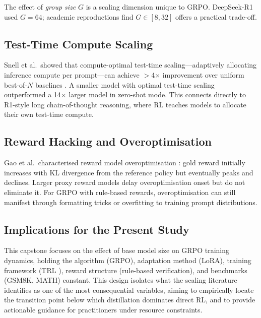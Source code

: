 \documentclass[12pt,a4paper]{report}
\theoremstyle{definition}
\begin{document}
The effect of \emph{group size} $G$ is a scaling dimension unique to GRPO. DeepSeek-R1 used $G = 64$; academic reproductions find $G \in [8, 32]$ offers a practical trade-off.

\subsection{Test-Time Compute Scaling}

Snell et al.\ showed that compute-optimal test-time scaling---adaptively allocating inference compute per prompt---can achieve $>$4$\times$ improvement over uniform best-of-$N$ baselines \cite{snell2024scaling}. A smaller model with optimal test-time scaling outperformed a 14$\times$ larger model in zero-shot mode. This connects directly to R1-style long chain-of-thought reasoning, where RL teaches models to allocate their own test-time compute.

\subsection{Reward Hacking and Overoptimisation}

Gao et al.\ characterised reward model overoptimisation \cite{gao2023scaling}: gold reward initially increases with KL divergence from the reference policy but eventually peaks and declines. Larger proxy reward models delay overoptimisation onset but do not eliminate it. For GRPO with rule-based rewards, overoptimisation can still manifest through formatting tricks or overfitting to training prompt distributions.

\subsection{Implications for the Present Study}

This capstone focuses on the effect of base model size on GRPO training dynamics, holding the algorithm (GRPO), adaptation method (LoRA), training framework (TRL \cite{vonwerra2022trl}), reward structure (rule-based verification), and benchmarks (GSM8K, MATH) constant. This design isolates what the scaling literature identifies as one of the most consequential variables, aiming to empirically locate the transition point below which distillation dominates direct RL, and to provide actionable guidance for practitioners under resource constraints.


\end{document}
